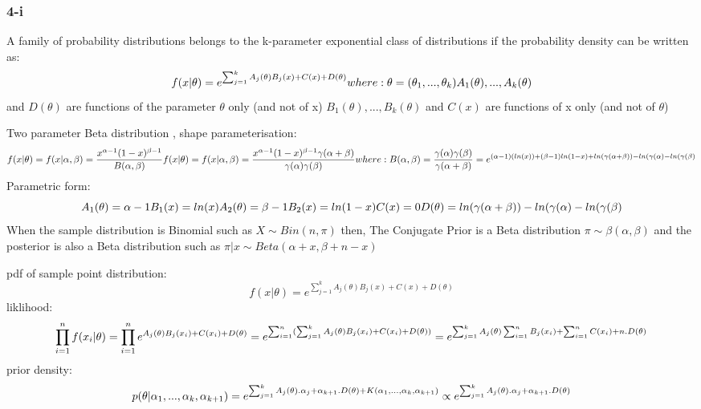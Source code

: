 \documentclass[]{article}
\begin{document}
\subsubsection{4-i}\label{i-1}

A family of probability distributions belongs to the k-parameter
exponential class of distributions if the probability density can be
written as: \[
f(x|\theta) = e^{\sum_{j=1}^kA_j(\theta)B_j(x)+C(x)+D(\theta)} \\
where:\\
\theta = (\theta_1,...,\theta_k) \\
A_1(\theta),...,A_k(\theta) \\
\] and \(D(\theta)\) are functions of the parameter \(\theta\) only (and
not of x) \(B_1(\theta),...,B_k(\theta)\) and \(C(x)\) are functions of
x only (and not of \(\theta\))

Two parameter Beta distribution , shape parameterisation: \[
f(x|\theta) = f(x|\alpha,\beta) = \frac{x^{\alpha-1}(1-x)^{\beta-1}}{B(\alpha,\beta)} \\
f(x|\theta) = f(x|\alpha,\beta) = \frac{x^{\alpha-1}(1-x)^{\beta-1}{\gamma(\alpha+\beta)}}{{\gamma(\alpha)\gamma(\beta)}} \\
where: \\
B(\alpha,\beta) = \frac{\gamma(\alpha)\gamma(\beta)}{\gamma(\alpha+\beta)} \\
= e^{(\alpha-1)(ln(x))+(\beta-1)ln(1-x)+ln(\gamma(\alpha+\beta))-ln(\gamma(\alpha)-ln(\gamma(\beta)}
\] Parametric form: \[
A_1(\theta) = \alpha-1 \\
B_1(x) = ln(x) \\
A_2(\theta) = \beta-1 \\
B_2(x) = ln(1-x) \\
C(x) = 0 \\
D(\theta) = ln(\gamma(\alpha+\beta))-ln(\gamma(\alpha)-ln(\gamma(\beta)
\] When the sample distribution is Binomial such as
\(X \sim Bin(n,\pi)\) then, The Conjugate Prior is a Beta distribution
\(\pi \sim \beta(\alpha,\beta)\) and the posterior is also a Beta
distribution such as \(\pi|x \sim Beta(\alpha+x,\beta+n-x)\)

pdf of sample point distribution: \[
f(x|\theta) = e^{\sum_{j=1}^kA_j(\theta)B_j(x)+C(x)+D(\theta)}
\] liklihood: \[
\prod_{i=1}^nf(x_i|\theta) = \prod_{i=1}^ne^{A_j(\theta)B_j(x_i)+C(x_i)+D(\theta)} \\
= e^{\sum_{i=1}^n(\sum_{j=1}^kA_j(\theta)B_j(x_i)+C(x_i)+D(\theta))} \\
= e^{\sum_{j=1}^kA_j(\theta)\sum_{i=1}^nB_j(x_i)+\sum_{i=1}^nC(x_i)+n.D(\theta)}
\] prior density: \[
p(\theta|\alpha_1,...,\alpha_k,\alpha_{k+1})\\ = e^{\sum_{j=1}^kA_j(\theta).\alpha_j+\alpha_{k+1}.D(\theta)+K(\alpha_1,...,\alpha_k,\alpha_{k+1})} \\
\propto e^{\sum_{j=1}^kA_j(\theta).\alpha_j+\alpha_{k+1}.D(\theta)}
\]
\end{document}
